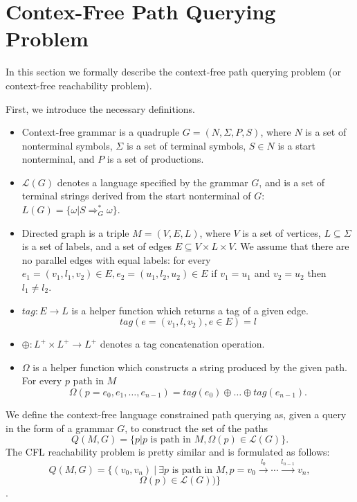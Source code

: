 \section{Contex-Free Path Querying Problem}

In this section we formally describe the context-free path querying problem (or context-free reachability problem).


First, we introduce the necessary definitions.
\begin{itemize}
  \item Context-free grammar is a quadruple $G=(N, \Sigma, P, S)$, where $N$ is a set of nonterminal symbols, $\Sigma$ is a set of terminal symbols, $S \in N$ is a start nonterminal, and $P$ is a set of productions. 
  \item $\mathcal{L}(G)$ denotes a language specified by the grammar $G$, and is a set of terminal strings derived from the start nonterminal of $G$: $L(G) = \{\omega | S \Rightarrow_{G}^{*} \omega\}$.
  \item Directed graph is a triple $M = (V,E,L)$, where $V$ is a set of vertices, $L \subseteq \Sigma$ is a set of labels, and a set of edges $E\subseteq V\times L\times V$. 
  We assume that there are no parallel edges with equal labels: for every $e_1=(v_1,l_1,v_2) \in E, e_2=(u_1,l_2,u_2) \in E$ if $v_1 = u_1$ and $v_2 = u_2$ then $l_1 \neq l_2$.
  \item $tag: E \rightarrow L$ is a helper function which returns a tag of a given edge. $$tag(e = (v_1,l,v_2), e \in E) = l$$
  \item $\oplus: L^+ \times L^+ \rightarrow L^+$ denotes a tag concatenation operation.
  \item $\Omega$ is a helper function which constructs a string produced by the given path. For every $p \text{ path in } M$
  $$ \Omega(p = e_{0},e_{1},\dots,e_{n-1}) = tag (e_{0}) \oplus \dots \oplus tag (e_{n-1}).$$
\end{itemize}

We define the context-free language constrained path querying as, given a query in the form of a grammar $G$, to construct the set of the paths $$Q(M,G)=\{p|p \text{ is path in } M, \Omega(p) \in \mathcal{L}(G)\}.$$
The CFL reachability problem is pretty similar and is formulated as follows: $$Q(M,G) =\{ (v_0,v_n) \ | \ \exists p \text{ is path in } M, p = v_0 \xrightarrow{l_0} \cdots \xrightarrow{l_{n-1}}v_n,$$
$$ \Omega(p) \in   \mathcal{L}(G))\}$$.

